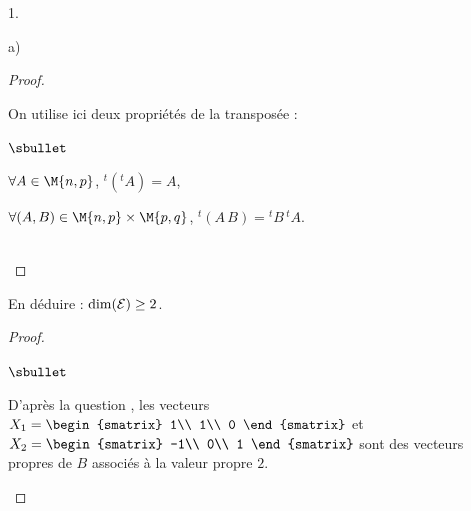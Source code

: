 \documentclass[11pt]{article}%
\begin{document}
\begin{noliste}{1.}
\begin{noliste}{a)}
\begin{proof}
      \begin{remark}
        On utilise ici deux propriétés de la transposée :
        \begin{noliste}{$\sbullet$}
	  \item $\forall A \in \M{n,p}$, ${}^t ({}^t A) = A$,
	  \item $\forall (A,B) \in \M{n,p} \times \M{p,q}$, 
	  ${}^t(A \, B) = {}^t B \, {}^t A$.
        \end{noliste}
      \end{remark}~\\[-1.4cm]
    \end{proof}
    
    
    \newpage

    
  \item En déduire : $\dim({\cal E}) \geq 2$.
    
    \begin{proof}~
      \begin{noliste}{$\sbullet$}
	\item D'après la question , les vecteurs $X_1=
	\begin{smatrix}
	  1\\
	  1\\
	  0
	\end{smatrix}$ et $X_2 =
	\begin{smatrix}
	  -1\\
	  0\\
	  1
	\end{smatrix}$ sont des vecteurs propres de $B$ associés à la 
	valeur propre $2$.
	

\end{noliste}
\end{proof}
\end{noliste}
\end{noliste}
\end{document}
